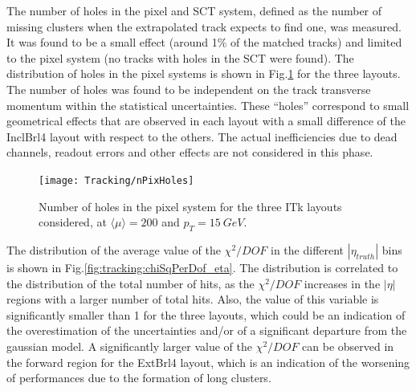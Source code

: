 \documentclass[a4paper,twoside,12pt]{book}
\begin{document}
\begin{table} [h]
\centering
	\caption{Average number of pixel, SCT and total hits in the three ITk layouts considered.}
	\label{tab:tracking:nHits}
\end{table}
 
The number of holes in the pixel and SCT system, defined as the number of missing clusters when the extrapolated track expects to find one, was measured. It was found to be
a small effect (around 1\% of the matched tracks) and limited to the pixel system (no tracks with holes in the SCT were found). The distribution of holes in the pixel systems is shown in Fig.\ref{fig:tracking:nHoles} for the three 
layouts. The number of holes was found to be independent on the track transverse momentum within the statistical uncertainties. 
These ``holes'' correspond to small geometrical effects that are observed in each layout with a small difference of the InclBrl4 layout with respect to the others. The actual inefficiencies due to dead channels, readout errors and other effects are not considered in this phase.\\

\begin{figure}
\centering
\texttt{[image: Tracking/nPixHoles]}
\caption{Number of holes in the pixel system for the three ITk layouts considered, at $\langle\mu\rangle = 200$ and $p_{T} = 15\ GeV$.}
\label{fig:tracking:nHoles}
\end{figure}

The distribution of the average value of the $\chi^{2}/DOF$ in the different $|\eta_{truth}|$ bins is shown in Fig.\ref{fig:tracking:chiSqPerDof_eta}. The distribution 
is correlated to the distribution of the total number of hits, as the $\chi^{2}/DOF$ increases in the $|\eta|$ regions with a larger number of total hits. Also, the value of this variable
is significantly smaller than 1 for the three layouts, which could be an indication of the overestimation of the uncertainties and/or of a significant departure from the gaussian model. A significantly larger value of the $\chi^{2}/DOF$ can be observed in the forward region for the ExtBrl4 layout, which is an indication of the worsening of performances
due to the formation of long clusters.\\
\end{document}
